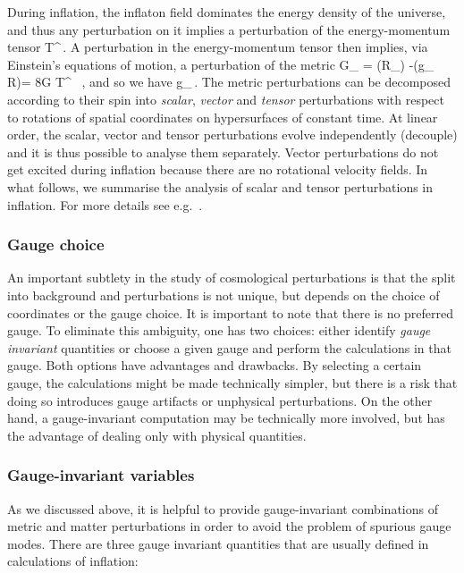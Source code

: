 During inflation,  the inflaton field dominates the energy density of the universe, and thus any perturbation on it  implies  a perturbation of the  energy-momentum tensor
\be
\delta\varphi \quad  \Longleftrightarrow  \quad \delta T^{\mu\nu}\,.
\ee
A perturbation in the energy-momentum tensor then implies, via Einstein's equations of motion, a perturbation of the metric
\be
\delta G_{\mu\nu} =  \lp \delta(R_{\mu\nu}) -\delta(g_{\mu\nu}\,R)\rp = 8\pi G \delta T^{\mu\nu} \, ,
\ee
and so we have
\be
\delta\varphi \quad  \Longleftrightarrow \quad \delta g_{\mu\nu}\,.
\ee
The metric perturbations can be decomposed according to their spin into {\em scalar}, {\em vector} and {\em tensor} perturbations with respect to rotations of spatial coordinates on hypersurfaces of constant time. At  linear order, the scalar, vector and tensor perturbations evolve independently (decouple) and it is thus possible to analyse them separately. Vector perturbations do not get excited during inflation because there are no rotational velocity fields. In what follows, we summarise the analysis of scalar and tensor perturbations in inflation. For more details see e.g.~\cite{Mukhanov:1990me,Riotto:2002yw}.

\subsubsection*{Gauge choice}

An important  subtlety in the study of cosmological perturbations is that  the split into background and perturbations  is not unique, but depends on the choice of coordinates or the gauge choice.  It is important to note that there is no preferred gauge.  
To eliminate this ambiguity, one has two choices:
either identify  {\em gauge invariant} quantities or choose a given gauge and perform the calculations in that gauge.
Both options have advantages and drawbacks. By selecting a certain gauge, the calculations might be made technically simpler, but there is a risk that doing so introduces gauge artifacts or unphysical perturbations. On the other hand, a gauge-invariant computation may be technically more involved, but has the advantage of dealing only with physical quantities.

\subsubsection*{Gauge-invariant variables}

As we discussed above, it is helpful to provide gauge-invariant combinations of metric and matter perturbations in order to avoid the problem of spurious gauge modes. There are three gauge invariant quantities that are usually  defined in calculations of inflation: \\

